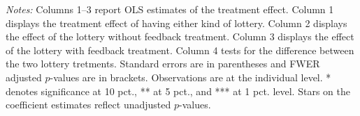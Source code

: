 \begin{table}[ht]
{\begin{threeparttable}
\begin{tabular}{l*{6}{c}}
\bottomrule \end{tabular} \begin{tablenotes}[flushleft] \footnotesize \item \emph{Notes:} Columns 1--3 report OLS estimates of the treatment effect. Column 1 displays the treatment effect of having either kind of lottery. Column 2 displays the effect of the lottery without feedback treatment. Column 3 displays the effect of the lottery with feedback treatment. Column 4 tests for the difference between the two lottery tretments. Standard errors are in parentheses and FWER adjusted \(p\)-values are in brackets. Observations are at the individual level. * denotes significance at 10 pct., ** at 5 pct., and *** at 1 pct. level. Stars on the coefficient estimates reflect unadjusted \(p\)-values. \end{tablenotes} \end{threeparttable} } \end{table}

